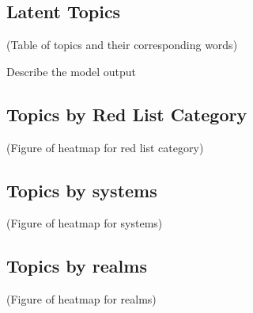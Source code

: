 \subsection{Latent Topics}

(Table of topics and their corresponding words)

Describe the model output

\subsection{Topics by Red List Category}

(Figure of heatmap for red list category)

\subsection{Topics by systems}

(Figure of heatmap for systems)

\subsection{Topics by realms}

(Figure of heatmap for realms)
